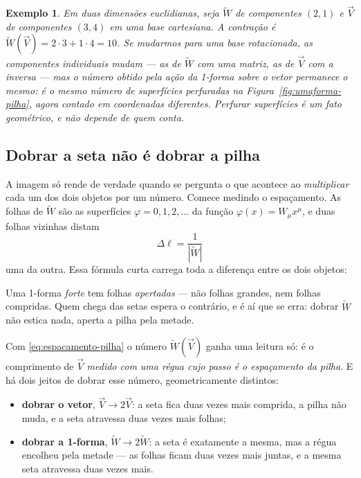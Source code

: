 \documentclass[12pt,a4paper,oneside]{book}
\theoremstyle{rgplain}
\newtheorem{example}{Exemplo}[chapter]
\theoremstyle{rgremark}
\begin{document}
\begin{example}\label{ex:umaforma-contracao}
Em duas dimensões euclidianas, seja $\tilde W$ de componentes $(2,1)$ e
$\vec V$ de componentes $(3,4)$ em uma base cartesiana. A contração é
$\tilde W(\vec V)=2\cdot3+1\cdot4=10$. Se mudarmos para uma base
rotacionada, as componentes individuais mudam --- as de $\tilde W$ com uma
matriz, as de $\vec V$ com a inversa --- mas o número obtido pela ação da 1-forma
sobre o vetor permanece o mesmo: é o mesmo número de superfícies perfuradas na
Figura~\ref{fig:umaforma-pilha}, agora contado em coordenadas diferentes.
Perfurar superfícies é um fato geométrico, e não depende de quem conta.
\end{example}

\subsection{Dobrar a seta não é dobrar a pilha}
\label{sec:dobrar-pilha}

A imagem só rende de verdade quando se pergunta o que acontece ao
\emph{multiplicar} cada um dos dois objetos por um número. Comece medindo o
espaçamento. As folhas de $\tilde W$ são as superfícies $\varphi=0,1,2,\dots$ da
função $\varphi(x)=W_\mu x^\mu$, e duas folhas vizinhas distam
\begin{equation}
  \Delta\ell=\frac{1}{|\tilde W|}
  \label{eq:espacamento-pilha}
\end{equation}
uma da outra. Essa fórmula curta carrega toda a diferença entre os dois
objetos:

\begin{central}[title={\sffamily\bfseries\footnotesize\color{rgAmbar}A MAGNITUDE DE UMA 1-FORMA É O INVERSO DO ESPAÇAMENTO}]
Uma 1-forma \emph{forte} tem folhas \emph{apertadas} --- não folhas grandes,
nem folhas compridas. Quem chega das setas espera o contrário, e é aí que se
erra: dobrar $\tilde W$ não estica nada, aperta a pilha pela metade.
\end{central}

Com \eqref{eq:espacamento-pilha} o número $\tilde W(\vec V)$ ganha uma leitura só: é o
comprimento de $\vec V$ \emph{medido com uma régua cujo passo é o espaçamento da
pilha}. E há dois jeitos de dobrar esse número, geometricamente distintos:

\begin{itemize}
  \item \textbf{dobrar o vetor}, $\vec V\to2\vec V$: a seta fica duas vezes mais
  comprida, a pilha não muda, e a seta atravessa duas vezes mais folhas;
  \item \textbf{dobrar a 1-forma}, $\tilde W\to2\tilde W$: a seta é exatamente a
  mesma, mas a régua encolheu pela metade --- as folhas ficam duas vezes mais
  juntas, e a mesma seta atravessa duas vezes mais.
\end{itemize}
\end{document}
